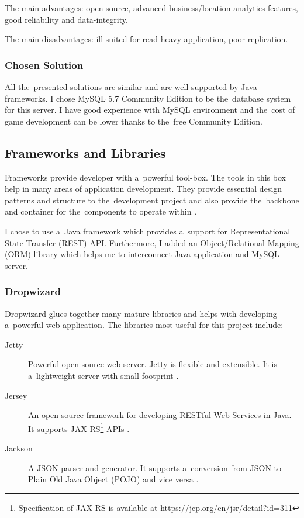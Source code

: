 		The main advantages: open source, advanced business/location analytics features, good reliability and data-integrity.
		
		The main disadvantages: ill-suited for read-heavy application, poor replication.
				
		\subsubsection*{Chosen Solution}
		All the~presented solutions are similar and are well-supported by Java frameworks. I chose MySQL 5.7 Community Edition to be the~database system for this server. I have good experience with MySQL environment and the~cost of game development can be lower thanks to the~free Community Edition. 
		
	\subsection{Frameworks and Libraries}
	Frameworks provide developer with a~powerful tool-box. The tools in this box help in many areas of application development. They provide essential design patterns and structure to the~development project and also provide the~backbone and container for the~components to operate within \cite{frameworks}.
	
	I chose to use a~Java framework which provides a~support for Representational State Transfer (REST) API. Furthermore, I added an Object/Relational Mapping (ORM) library which helps me to interconnect Java application and MySQL server.
	
		\subsubsection*{Dropwizard}
		Dropwizard \cite{dropwizard} glues together many mature libraries and helps with developing a~powerful web-application. The libraries most useful for this project include:
		\begin{description}
			\item[Jetty] Powerful open source web server. Jetty is flexible and extensible. It is a~lightweight server with small footprint \cite{jetty}.
			\item[Jersey] An open source framework for developing RESTful Web Services in Java. It supports JAX-RS\footnote{Specification of JAX-RS is available at \url{https://jcp.org/en/jsr/detail?id=311}} APIs \cite{jersey}.
			\item[Jackson] A JSON parser and generator. It supports a~conversion from JSON to Plain Old Java Object (POJO) and vice versa \cite{jackson}.			
		\end{description}
			
